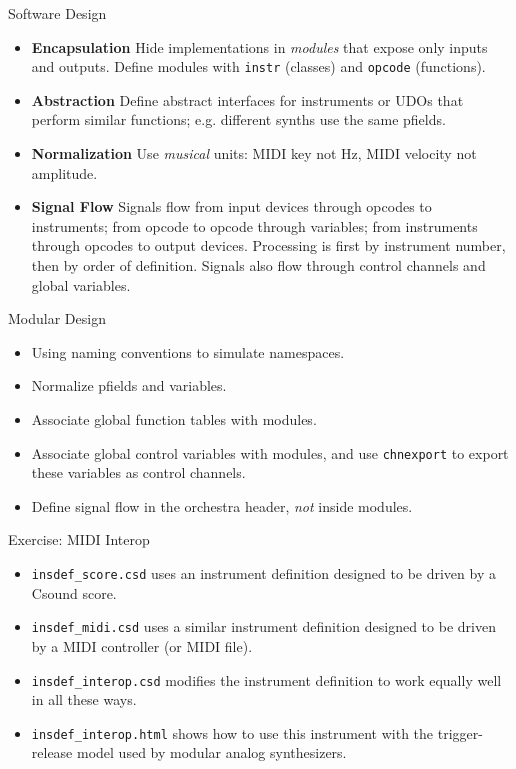 \documentclass{beamer}
\begin{document}
    \begin{frame}{Software Design}
        \begin{itemize}
            \item \textbf{Encapsulation} Hide implementations in \textit{modules} that
            expose only inputs and outputs. Define modules with \texttt{instr} (classes) and
            \texttt{opcode} (functions).
            \item \textbf{Abstraction} Define abstract interfaces for instruments or
            UDOs that perform similar functions; e.g. different synths use the same
            pfields.
            \item \textbf{Normalization} Use \textit{musical} units: MIDI key not
            Hz, MIDI velocity not amplitude.
            \item \textbf{Signal Flow} Signals flow from input devices through
            opcodes to instruments; from opcode to opcode through variables; from
            instruments through opcodes to output devices. Processing is first by
            instrument number, then by order of definition. Signals also flow through
            control channels and global variables.
        \end{itemize}
    \end{frame}
    
    \begin{frame}{Modular Design}
        \begin{itemize}
            \item Using naming conventions to simulate namespaces.
            \item Normalize pfields and variables.
            \item Associate global function tables with modules.
            \item Associate global control variables with modules, and use
            \texttt{chnexport} to  export these variables as control channels.
            \item Define signal flow in the orchestra header, \textit{not} inside modules.
        \end{itemize}
    \end{frame}
    
    \begin{frame}{Exercise: MIDI Interop}
    	\begin{itemize}
		\item \texttt{insdef\_score.csd} uses an instrument definition designed to be driven by a Csound score.
		\item \texttt{insdef\_midi.csd}  uses a similar instrument definition designed to be driven by a MIDI controller (or MIDI file).
		\item \texttt{insdef\_interop.csd}  modifies the instrument definition to work equally well in all these ways.
		\item \texttt{insdef\_interop.html} shows how to use this instrument with the trigger-release model used by modular analog synthesizers.
	\end{itemize}
    \end{frame}
    
\end{document}
